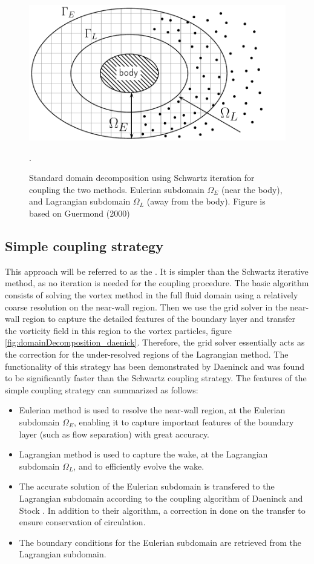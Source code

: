 	\begin{figure}[!t]
		\centering
		\includegraphics[width=0.6\linewidth]{figures/introduction/domainDecomposition_typical_type2.pdf}
		\caption{Standard domain decomposition using Schwartz iteration for coupling the two methods. Eulerian subdomain $\Omega_E$ (near the body), and Lagrangian subdomain $\Omega_L$ (away from the body). Figure is based on Guermond (2000) \cite{Guermond2000a}}.
		\label{fig:domainDecomposition}
	\end{figure}

\subsection{Simple coupling strategy}
This approach will be referred to as the . It is simpler than the Schwartz iterative method, as no iteration is needed for the coupling procedure. The basic algorithm consists of solving the vortex method in the full fluid domain using a relatively coarse resolution on the near-wall region. Then we use the grid solver in the near-wall region to capture the detailed features of the boundary layer and transfer the vorticity field in this region to the vortex particles, figure \ref{fig:domainDecomposition_daenick}. Therefore, the grid solver essentially acts as the correction for the under-resolved regions of the Lagrangian method. The functionality of this strategy has been demonstrated by Daeninck and was found to be significantly faster than the Schwartz coupling strategy. The features of the simple coupling strategy can summarized as follows:

	\begin{itemize}
	\item Eulerian method is used to resolve the near-wall region, at the Eulerian subdomain $\Omega_E$, enabling it to capture important features of the boundary layer (such as flow separation) with great accuracy.
	
	\item Lagrangian method is used to capture the wake, at the Lagrangian subdomain $\Omega_L$, and to efficiently evolve the wake.
	
	\item The accurate solution of the Eulerian subdomain is transfered to the Lagrangian subdomain according to the coupling algorithm of Daeninck \cite{Daeninck2006} and Stock \cite{Stock2010a}. In addition to their algorithm, a correction in done on the transfer to ensure conservation of circulation.
	
	\item The boundary conditions for the Eulerian subdomain are retrieved from the Lagrangian subdomain.
	\end{itemize}


